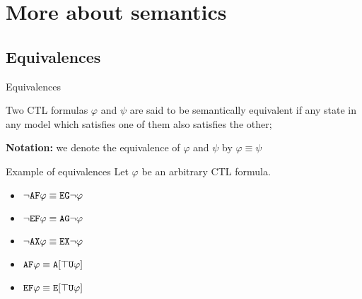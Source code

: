 \section{More about semantics}
\subsection{Equivalences}

\begin{frame}{Equivalences}
	\begin{definition}
		Two CTL formulas $\varphi$ and $\psi$ are said to be \alert{semantically	equivalent} if any state in any model which satisfies one of them also satisfies the other; 
	\end{definition}\pause
	\textbf{Notation:} we denote the equivalence of $\varphi$ and $\psi$ by $\varphi \equiv \psi$
\end{frame}

\begin{frame}{Example of equivalences}
    Let $\varphi$ be an arbitrary CTL formula.
        
    \begin{itemize}
        \item
        {
            $\neg \texttt{A}\texttt{F} \varphi \equiv \texttt{E}\texttt{G} \neg \varphi $    
        }
        \item
        {
            $\neg \texttt{E}\texttt{F} \varphi \equiv \texttt{A}\texttt{G} \neg \varphi$    
        }
        \item
        {
            $\neg \texttt{A}\texttt{X} \varphi \equiv \texttt{E}\texttt{X} \neg \varphi$    
        }
        \item
        {
            $\texttt{A}\texttt{F}\varphi \equiv \texttt{A}[\top \texttt{U}\varphi]$    
        }
        \item
        {
            $\texttt{E}\texttt{F} \varphi \equiv \texttt{E}[\top \texttt{U}\varphi]$    
        }
    \end{itemize}
\end{frame}